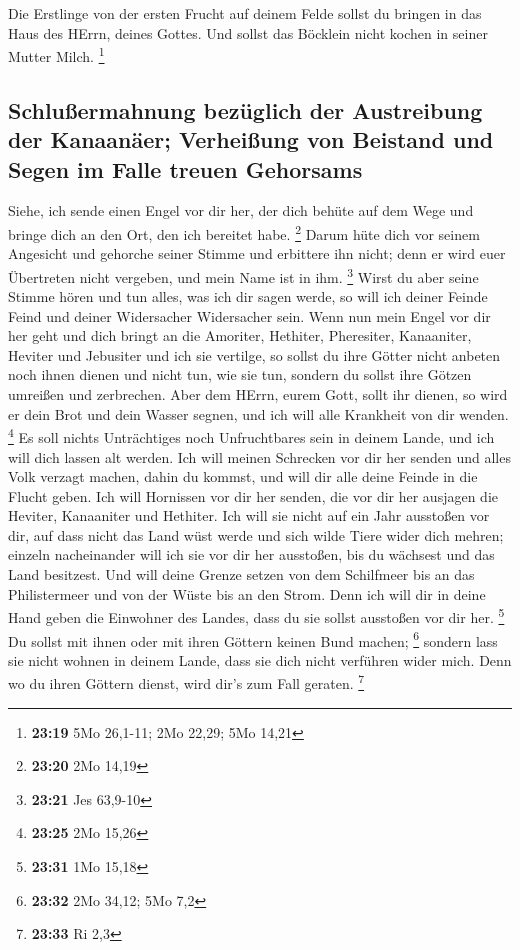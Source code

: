  Die Erstlinge von der ersten Frucht auf deinem Felde
sollst du bringen in das Haus des HErrn, deines Gottes. Und sollst das
Böcklein nicht kochen in seiner Mutter Milch. \footnote{\textbf{23:19}
  5Mo 26,1-11; 2Mo 22,29; 5Mo 14,21}

\hypertarget{schluuxdfermahnung-bezuxfcglich-der-austreibung-der-kanaanuxe4er-verheiuxdfung-von-beistand-und-segen-im-falle-treuen-gehorsams}{%
\subsection{Schlußermahnung bezüglich der Austreibung der Kanaanäer;
Verheißung von Beistand und Segen im Falle treuen
Gehorsams}\label{schluuxdfermahnung-bezuxfcglich-der-austreibung-der-kanaanuxe4er-verheiuxdfung-von-beistand-und-segen-im-falle-treuen-gehorsams}}

 Siehe, ich sende einen Engel vor dir her, der dich
behüte auf dem Wege und bringe dich an den Ort, den ich bereitet habe.
\footnote{\textbf{23:20} 2Mo 14,19}  Darum hüte dich vor
seinem Angesicht und gehorche seiner Stimme und erbittere ihn nicht;
denn er wird euer Übertreten nicht vergeben, und mein Name ist in ihm.
\footnote{\textbf{23:21} Jes 63,9-10}  Wirst du aber
seine Stimme hören und tun alles, was ich dir sagen werde, so will ich
deiner Feinde Feind und deiner Widersacher Widersacher sein.
 Wenn nun mein Engel vor dir her geht und dich bringt an
die Amoriter, Hethiter, Pheresiter, Kanaaniter, Heviter und Jebusiter
und ich sie vertilge,  so sollst du ihre Götter nicht
anbeten noch ihnen dienen und nicht tun, wie sie tun, sondern du sollst
ihre Götzen umreißen und zerbrechen.  Aber dem HErrn,
eurem Gott, sollt ihr dienen, so wird er dein Brot und dein Wasser
segnen, und ich will alle Krankheit von dir wenden. \footnote{\textbf{23:25}
  2Mo 15,26}  Es soll nichts Unträchtiges noch
Unfruchtbares sein in deinem Lande, und ich will dich lassen alt werden.
 Ich will meinen Schrecken vor dir her senden und alles
Volk verzagt machen, dahin du kommst, und will dir alle deine Feinde in
die Flucht geben.  Ich will Hornissen vor dir her senden,
die vor dir her ausjagen die Heviter, Kanaaniter und Hethiter.
 Ich will sie nicht auf ein Jahr ausstoßen vor dir, auf
dass nicht das Land wüst werde und sich wilde Tiere wider dich mehren;
 einzeln nacheinander will ich sie vor dir her ausstoßen,
bis du wächsest und das Land besitzest.  Und will deine
Grenze setzen von dem Schilfmeer bis an das Philistermeer und von der
Wüste bis an den Strom. Denn ich will dir in deine Hand geben die
Einwohner des Landes, dass du sie sollst ausstoßen vor dir her.
\footnote{\textbf{23:31} 1Mo 15,18}  Du sollst mit ihnen
oder mit ihren Göttern keinen Bund machen; \footnote{\textbf{23:32} 2Mo
  34,12; 5Mo 7,2}  sondern lass sie nicht wohnen in
deinem Lande, dass sie dich nicht verführen wider mich. Denn wo du ihren
Göttern dienst, wird dir's zum Fall geraten. \footnote{\textbf{23:33} Ri
  2,3}


